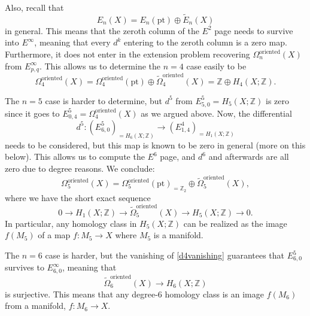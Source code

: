 \documentclass[12pt]{article}
\numberwithin{equation}{section}
\numberwithin{figure}{section}
\theoremstyle{remark}
\def\bZ{\mathbb{Z}}
\def\pt{\mathrm{pt}}
\begin{document}
Also, recall that \begin{equation}
E_n(X)=E_n(\pt)\oplus\tilde E_n(X)
\end{equation} in general.
This means that  the zeroth column of the $E^2$ page needs to survive into $E^\infty$,
meaning that every $d^k$ entering to the zeroth column is a zero map.
Furthermore, it does not enter in the extension problem recovering $\Omega^\text{oriented}_n(X)$
from $E^\infty_{p,q}$.
This allows us to determine the $n=4$ case easily to be \begin{equation}
\Omega^\text{oriented}_{4}(X) = \Omega^\text{oriented}_{4}(\pt)  \oplus
\tilde \Omega^\text{oriented}_4(X)
= \bZ \oplus H_4(X;\bZ).
\end{equation}

The $n=5$ case is harder to determine, but $d^5$ from $E^5_{5,0}=H_5(X;\bZ)$
is zero since it goes to $E^5_{0,4}=\Omega^\text{oriented}_4(X)$ as we argued above.
Now, the differential \begin{equation}
d^5\colon (E^5_{6,0})_{=H_6(X;\bZ)} \to (E^4_{1,4})_{=H_1(X;\bZ)} \label{d4vanishing}
\end{equation}
needs to be considered,  but this map is known to be zero in general
(more on this below).
This allows us to compute the $E^6$ page, and $d^6$ and afterwards are all zero due to degree reasons.
We conclude: \begin{equation}
\Omega^\text{oriented}_{5}(X) = \Omega^\text{oriented}_{5}(\pt)_{=\bZ_2}  \oplus
\tilde \Omega^\text{oriented}_5(X),
\end{equation} where we have the short exact sequence \begin{equation}
0 \to H_1(X;\bZ) \to \tilde \Omega^\text{oriented}_5(X) \to H_5(X;\bZ)\to 0.
\end{equation}
In particular, any homology class in $H_5(X;\bZ)$ 
can be realized as the image $f(M_5)$ of a map $f:M_5\to X$ where $M_5$ is a manifold.

The $n=6$ case is harder, but the vanishing of \eqref{d4vanishing} guarantees that
$E^5_{6,0}$ survives to $E^\infty_{6,0}$, meaning that \begin{equation}
\tilde\Omega^\text{oriented}_6(X)\to H_6(X;\bZ)
\end{equation} is surjective.
This means that any degree-6 homology class is an image $f(M_6)$ from a manifold, $f:M_6\to X$.
\end{document}

